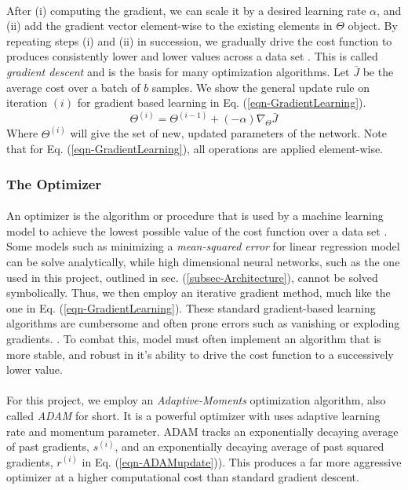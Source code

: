 \documentclass[12pt,letterpaper]{article}
\begin{document}
\paragraph*{}After (i) computing the gradient, we can scale it by a desired learning rate $\alpha$, and (ii) add the gradient vector element-wise to the existing elements in $\Theta$ object. By repeating steps (i) and (ii) in succession, we gradually drive the cost function to produces consistently lower and lower values across a data set \cite{Geron}. This is called \textit{gradient descent} and is the basis for many optimization algorithms. Let $\bar{J}$ be the average cost over a batch of $b$ samples. We show the general update rule on iteration $(i)$ for gradient based learning in Eq. (\ref{eqn-GradientLearning}).
\begin{equation}
\label{eqn-GradientLearning}
\Theta^{(i)} = \Theta^{(i-1)} + (-\alpha) \nabla_{\Theta} \bar{J}
\end{equation}
Where $\Theta^{(i)}$ will give the set of new, updated parameters of the network. Note that for Eq. (\ref{eqn-GradientLearning}), all operations are applied element-wise.


\subsubsection{The Optimizer}

\paragraph*{}An optimizer is the algorithm or procedure that is used by a machine learning model to achieve the lowest possible value of the cost function over a data set \cite{Geron}. Some models such as minimizing a \textit{mean-squared error} for linear regression model can be solve analytically, while high dimensional neural networks, such as the one used in this project, outlined in sec. (\ref{subsec-Architecture}), cannot be solved symbolically. Thus, we then employ an iterative gradient method, much like the one in Eq. (\ref{eqn-GradientLearning}). These standard gradient-based learning algorithms are cumbersome and often prone errors such as vanishing or exploding gradients. \cite{Geron,Goodfellow,Loy}. To combat this, model must often implement an algorithm that is more stable, and robust in it's ability to drive the cost function to a successively lower value.

\paragraph*{}For this project, we employ an \textit{Adaptive-Moments} optimization algorithm, also called \textit{ADAM} for short. It is a powerful optimizer with uses adaptive learning rate and momentum parameter. ADAM tracks an exponentially decaying average of past gradients, $s^{(i)}$, and an exponentially decaying average of past squared gradients, $r^{(i)}$ in Eq. (\ref{eqn-ADAMupdate}))\cite{Geron}. This produces a far more aggressive optimizer at a higher computational cost than standard gradient descent.
\end{document}
